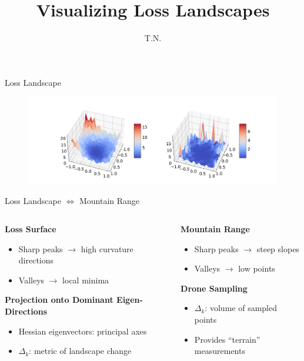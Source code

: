 \documentclass{beamer}
\title{Visualizing Loss Landscapes}
\author{T.N.}
\date{}
\begin{document}
\begin{frame}{Loss Landscape}
    \begin{figure}
        \centering
        \includegraphics[width=1.86\textwidth]{loss_eigen_1_2.pdf}
    \end{figure}
\end{frame}

\begin{frame}{Loss Landscape \(\Leftrightarrow\) Mountain Range}
    \begin{columns}[T,onlytextwidth]
        \begin{column}{0.48\textwidth}
            \textbf{Loss Surface}
            \begin{itemize}
                \item Sharp peaks \(\rightarrow\) high curvature directions
                \item Valleys \(\rightarrow\) local minima
            \end{itemize}

            \vspace{1em}
            \textbf{Projection onto Dominant Eigen-Directions}
            \begin{itemize}
                \item Hessian eigenvectors: principal axes
                \item \(\Delta_k\): metric of landscape change
            \end{itemize}
        \end{column}

        \begin{column}{0.48\textwidth}
            \textbf{Mountain Range}
            \begin{itemize}
                \item Sharp peaks \(\rightarrow\) steep slopes
                \item Valleys \(\rightarrow\) low points
            \end{itemize}

            \vspace{1em}
            \textbf{Drone Sampling}
            \begin{itemize}
                \item \(\Delta_k\): volume of sampled points
                \item Provides “terrain” measurements
            \end{itemize}
        \end{column}
    \end{columns}


\end{frame}
\end{document}

